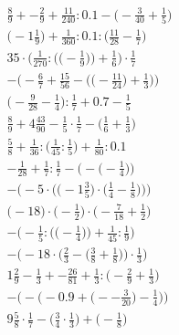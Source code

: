 \documentclass[8pt]{article}
\begin{document}
\begin{align}
\frac{8}{9} + -\frac{2}{9} + \frac{11}{240} : 0.1 - \big(-\frac{3}{40} + \frac{1}{5}\big) \\
\big(-1\frac{1}{9}\big) + \frac{1}{360} : 0.1 : \big(\frac{11}{28} - \frac{1}{7}\big) \\
35 \cdot \bigg(\frac{1}{270} : \Big(\big(-\frac{1}{9}\big)\Big) + \frac{1}{6}\bigg) \cdot \frac{1}{7} \\
-\bigg(-\frac{6}{7} + \frac{15}{56} - \Big(\big(-\frac{11}{24}\big) + \frac{1}{3}\Big)\bigg) \\
\big(-\frac{9}{28} - \frac{1}{4}\big) : \frac{1}{7} + 0.7 - \frac{1}{5} \\
\frac{8}{9} + 4\frac{43}{90} - \frac{1}{5} \cdot \frac{1}{7} - \big(\frac{1}{6} + \frac{1}{3}\big) \\
\frac{5}{8} + \frac{1}{36} : \big(\frac{1}{45} : \frac{1}{5}\big) + \frac{1}{80} : 0.1 \\
-\frac{1}{28} + \frac{1}{7} : \frac{1}{7} - \Big(-\big(-\frac{1}{4}\big)\Big) \\
-\bigg(-5 \cdot \Big(\big(-1\frac{3}{5}\big) \cdot \big(\frac{1}{4} - \frac{1}{8}\big)\Big)\bigg) \\
\big(-18\big) \cdot \big(-\frac{1}{2}\big) \cdot \big(-\frac{7}{18} + \frac{1}{2}\big) \\
-\bigg(-\frac{1}{5} : \Big(\big(-\frac{1}{4}\big)\Big) + \frac{1}{45} : \frac{1}{9}\bigg) \\
-\bigg(-18 \cdot \Big(\frac{2}{3} - \big(\frac{3}{8} + \frac{1}{8}\big)\Big) \cdot \frac{1}{3}\bigg) \\
1\frac{2}{9} - \frac{1}{3} + -\frac{26}{81} + \frac{1}{3} : \big(-\frac{2}{9} + \frac{1}{3}\big) \\
-\bigg(-\Big(-0.9 + \big(--\frac{3}{20}\big) - \frac{1}{4}\Big)\bigg) \\
9\frac{5}{8} \cdot \frac{1}{7} - \big(\frac{3}{4} \cdot \frac{1}{3}\big) + \big(-\frac{1}{8}\big)
\end{align}
\end{document}
